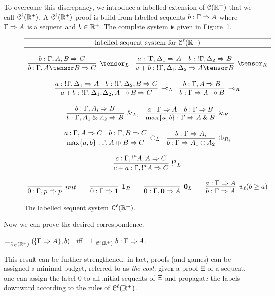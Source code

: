 To overcome this discrepancy, we introduce a  labelled extension of $\mathcal{C}(\mathbb{R}^+)$ that we call $\mathcal{C}^\ell(\mathbb{R}^+)$. A $\mathcal{C}^\ell(\mathbb{R}^+)$-proof is build from labelled sequents $b: \Gamma\Rightarrow A$ where $\Gamma\Rightarrow A$ is a sequent and $b\in\mathbb{R}^+$. The complete system is given in Figure~\ref{fig:lll}. 
\begin{figure}[t]
{
\[
\begin{array}{c}
\hline\mbox{labelled sequent system for }\laIMALLR\\\hline\\
 \infer[\tensor_L]{b: \Gamma, A \tensor B \seq C}
{b: \Gamma, A, B \seq C} 
\quad 
\infer[\tensor_R]{a+b:\nbang{}\Gamma,\Delta_1, \Delta_2 \seq A\tensor B}
{a:\nbang{}\Gamma,\Delta_1 \seq A & b:\nbang{}\Gamma,\Delta_2 \seq B}
\\\\
\infer[\lolli_L]{a+b:\nbang{}\Gamma,\Delta_1, \Delta_2, A \lolli B \seq C}
{a:\nbang{}\Gamma,\Delta_1 \seq A & b:\nbang{}\Gamma,\Delta_2, B \seq C}
\quad 
\infer[\lolli_R]{b:\Gamma \seq A \lolli B}{b:\Gamma, A \seq B}
\\\\
 \infer[\with_{L_i}]{b:\Gamma, A_1 \with A_2 \seq B}
{b:\Gamma, A_i\seq B} 
\quad 
\infer[\with_R]{\max\{a,b\}: \Gamma \seq A \with B}
{a:\Gamma \seq A & b:\Gamma \seq B}
\\\\
\infer[\oplus_L]{\max\{a,b\}:\Gamma, A \oplus B \seq C}
{a:\Gamma, A \seq C & b:\Gamma, B \seq C}
\quad 
\infer[\oplus_{R_i}]{b:\Gamma \seq A_1 \oplus A_2}{b:\Gamma \seq A_i}
\\\\
\infer[\nbang{a}_L]{c+a:\Gamma,\nbang{a}A\seq C}{c:\Gamma,\nbang{a}A,A\seq C}
\\\\
  \infer[init]{0:\Gamma,p \seq p}{} 
 \qquad
\infer[\one_R]{0:\Gamma \seq \one}{}
\qquad 
\infer[\zero_L]{0: \Gamma,\zero\seq A}{}
\qquad 
\infer[w_{\ell} (b\geq a)]{b: \Gamma\seq A}{a:\Gamma\seq A}
\end{array}
\]}\caption{The labelled sequent system $\mathcal{C}^\ell(\mathbb{R}^+)$.}
\label{fig:lll}
\end{figure}
Now we can  prove the desired correspondence.
\begin{theorem}
\label{theorem:adeq2}
$\models^{}_{\mathcal{G}_{\mathcal{C}}(\mathbb{R}^+)}(\{\Gamma\Rightarrow A\},b)\quad\mbox{iff}\quad\vdash_{\mathcal{C}^\ell(\mathbb{R}^+)}b: \Gamma\Rightarrow A$. 
\end{theorem}
This result can be further strengthened: in fact, proofs (and games) can be assigned a minimal budget, referred to as {\em the cost}: given a proof $\Xi$ of a sequent, one can assign the label $0$ to all initial sequents of $\Xi$ and propagate the labels downward according to the rules of $\mathcal{C}^\ell(\mathbb{R}^+)$.

